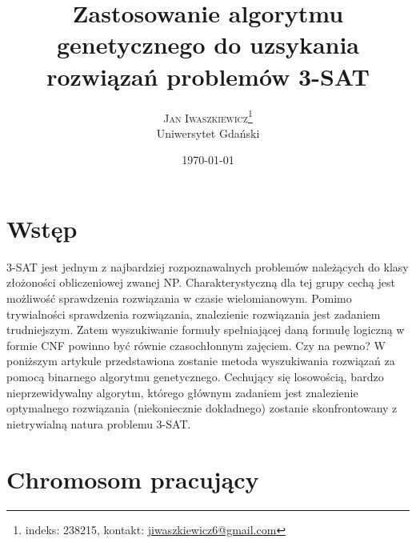 \documentclass[twoside,twocolumn]{article}
\title{Zastosowanie algorytmu genetycznego do uzsykania rozwiązań problemów 3-SAT} %
\author{%
\textsc{Jan Iwaszkiewicz}\thanks{indeks: 238215, kontakt: \href{mailto:jiwaszkiewicz6@gmail.com}{jiwaszkiewicz6@gmail.com}} \\[1ex] %
\normalsize Uniwersytet Gdański \\ %
}
\date{\today} %
\begin{document}
\maketitle


\section{Wstęp}

\lettrine[nindent=0em,lines=3]{3} -SAT jest jednym z najbardziej rozpoznawalnych problemów
należących do klasy złożoności obliczeniowej zwanej NP. Charakterystyczną dla tej grupy
cechą jest możliwość sprawdzenia rozwiązania w czasie wielomianowym. Pomimo trywialności
sprawdzenia rozwiązania, znalezienie rozwiązania jest zadaniem trudniejszym. Zatem wyszukiwanie
formuły spełniającej daną formułę logiczną w formie CNF powinno być równie czasochłonnym zajęciem.
Czy na pewno? W poniższym artykule przedstawiona zostanie metoda wyszukiwania rozwiązań za pomocą
binarnego algorytmu genetycznego. Cechujący się losowością, bardzo nieprzewidywalny algorytm, którego głównym zadaniem jest znalezienie optymalnego rozwiązania (niekoniecznie dokładnego) zostanie skonfrontowany z nietrywialną natura problemu 3-SAT.

\section{Chromosom pracujący}
\end{document}
